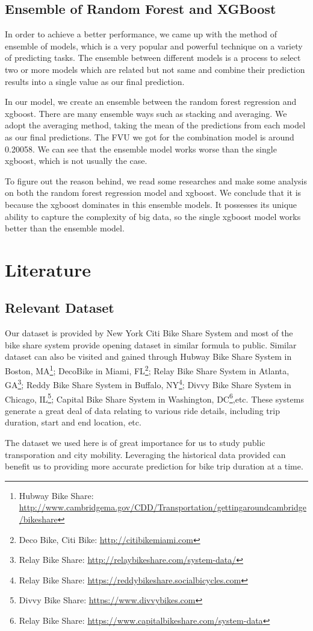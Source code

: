 \subsection{Ensemble of Random Forest and XGBoost}
 
 \par In order to achieve a better performance, we came up with the method of ensemble of models\cite{ka}, which is a very popular and powerful technique on a variety of predicting tasks\cite{cor}. The ensemble between different models is a process to select two or more models which are related but not same and combine their prediction results into a single value as our final prediction.
 \par In our model, we create an ensemble between the random forest regression and xgboost. There are many ensemble ways such as stacking and averaging. We adopt the averaging method, taking the mean of the predictions from each model as our final predictions. The FVU we got for the combination model is around 0.20058. We can see that the ensemble model works worse than the single xgboost, which is not usually the case. 
 \par To figure out the reason behind, we read some researches\cite{cor} and make some analysis on both the random forest regression model and xgboost\cite{die}. We conclude that it is because the xgboost dominates in this ensemble models. It possesses its unique ability to capture the complexity of big data, so the single xgboost model works better than the ensemble model.

\section{Literature}
\subsection{Relevant Dataset}
\par Our dataset is provided by New York Citi Bike Share System and most of the bike share system provide opening dataset in similar formula to public. Similar dataset can also be visited and gained through Hubway Bike Share System in Boston, MA\footnote{Hubway Bike Share:
\url{http://www.cambridgema.gov/CDD/Transportation/gettingaroundcambridge/bikeshare}}; DecoBike in Miami, FL\footnote{Deco Bike, Citi Bike:
\url{http://citibikemiami.com}}; Relay Bike Share System in Atlanta, GA\footnote{Relay Bike Share:
\url{http://relaybikeshare.com/system-data/}}; Reddy Bike Share System in Buffalo, NY\footnote{Relay Bike Share:
\url{https://reddybikeshare.socialbicycles.com}}; Divvy Bike Share System in Chicago, IL\footnote{Divvy Bike Share:
\url{https://www.divvybikes.com}}; Capital Bike Share System in Washington, DC\footnote{Relay Bike Share:
\url{https://www.capitalbikeshare.com/system-data}},etc. These systems generate a great deal of data relating to various ride details, including trip duration, start and end location, etc.
\par The dataset we used here is of great importance for us to study public transporation and city mobility. Leveraging the historical data provided can benefit us to providing more accurate prediction for bike trip duration at a time.
